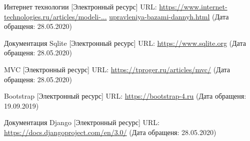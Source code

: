 \documentclass[a4paper, 14pt]{article}
\begin{document}
	\begin{thebibliography}{3}
		
		 Интернет технологии [Электронный ресурс]
		URL: \underline{https://www.internet-technologies.ru/articles/modeli-...}
		\underline{upravleniya-bazami-dannyh.html} (Дата обращеня: 28.05.2020)
		\hfill \break
		
		Документация Sqlite [Электронный ресурс]
		URL: \underline{https://www.sqlite.org} (Дата обращеня: 28.05.2020)
		\hfill \break
		
		 MVC [Электронный ресурс]
		URL: \underline{https://tproger.ru/articles/mvc/} (Дата обращеня: 28.05.2020)
		\hfill \break
		
		 Bootstrap [Электронный ресурс] URL: \underline{https://bootstrap-4.ru}  (Дата обращеня: 19.09.2019)
		
		 Документация Django [Электронный ресурс]
		URL: \underline{https://docs.djangoproject.com/en/3.0/} (Дата обращеня: 28.05.2020)
		\hfill \break
		
	\end{thebibliography}

    
\end{document}
